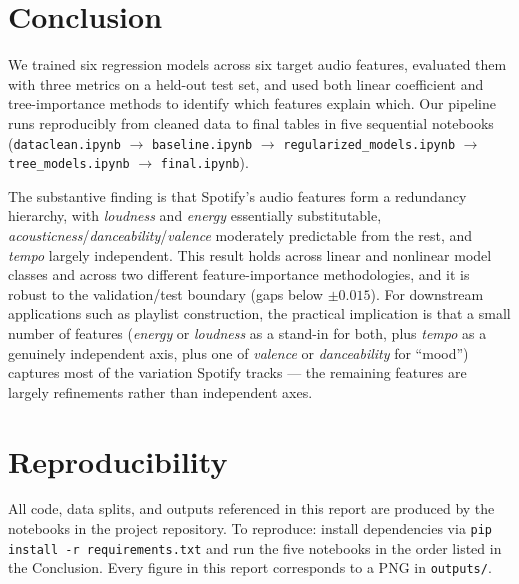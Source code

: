 \documentclass[11pt]{article}
\begin{document}
\section{Conclusion}

We trained six regression models across six target audio features, evaluated them with three metrics on a held-out test set, and used both linear coefficient and tree-importance methods to identify which features explain which. Our pipeline runs reproducibly from cleaned data to final tables in five sequential notebooks (\texttt{dataclean.ipynb} $\to$ \texttt{baseline.ipynb} $\to$ \texttt{regularized\_models.ipynb} $\to$ \texttt{tree\_models.ipynb} $\to$ \texttt{final.ipynb}).

The substantive finding is that Spotify's audio features form a redundancy hierarchy, with \emph{loudness} and \emph{energy} essentially substitutable, \emph{acousticness}/\emph{danceability}/\emph{valence} moderately predictable from the rest, and \emph{tempo} largely independent. This result holds across linear and nonlinear model classes and across two different feature-importance methodologies, and it is robust to the validation/test boundary (gaps below $\pm 0.015$). For downstream applications such as playlist construction, the practical implication is that a small number of features (\emph{energy} or \emph{loudness} as a stand-in for both, plus \emph{tempo} as a genuinely independent axis, plus one of \emph{valence} or \emph{danceability} for ``mood'') captures most of the variation Spotify tracks --- the remaining features are largely refinements rather than independent axes.

\section*{Reproducibility}

All code, data splits, and outputs referenced in this report are produced by the notebooks in the project repository. To reproduce: install dependencies via \texttt{pip install -r requirements.txt} and run the five notebooks in the order listed in the Conclusion. Every figure in this report corresponds to a PNG in \texttt{outputs/}.
\end{document}
